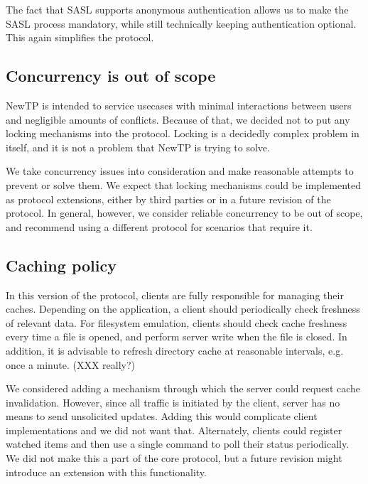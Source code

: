 The fact that SASL supports anonymous authentication allows us to make the SASL process mandatory, while still
technically keeping authentication optional. This again simplifies the protocol.

%

\subsection{Concurrency is out of scope}

NewTP is intended to service usecases with minimal interactions between users and negligible amounts of
conflicts. Because of that, we decided not to put any locking mechanisms into the protocol. Locking is
a decidedly complex problem in itself, and it is not a problem that NewTP is trying to solve.

We take concurrency issues into consideration and make reasonable attempts to prevent or solve them. We expect
that locking mechanisms could be implemented as protocol extensions, either by third parties or in a future
revision of the protocol. In general, however, we consider reliable concurrency to be out of scope, and
recommend using a different protocol for scenarios that require it.

%

\subsection{Caching policy}

In this version of the protocol, clients are fully responsible for managing their caches.  Depending on the
application, a client should periodically check freshness of relevant data.  For filesystem emulation, clients
should check cache freshness every time a file is opened, and perform server write when the file is closed.
In addition, it is advisable to refresh directory cache at reasonable intervals, e.g. once a minute.  (XXX
really?)

We considered adding a mechanism through which the server could request cache invalidation. However, since all
traffic is initiated by the client, server has no means to send unsolicited updates. Adding this would
complicate client implementations and we did not want that. Alternately, clients could register watched items
and then use a single command to poll their status periodically. We did not make this a part of the core
protocol, but a future revision might introduce an extension with this functionality.


